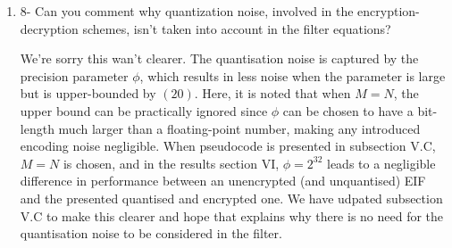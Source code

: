 \documentclass[a4paper]{scrartcl}
\newenvironment{rebuttal}{\begin{enumerate}[label={\color{grey}\thesection.\arabic{enumi}},leftmargin=0pt,ref=\thesection.\arabic{enumi}]}{\end{enumerate}}
\newcommand{\reviewtext}[1]{{\color{nblue} #1}}
\begin{document}
\begin{rebuttal}
\textit{+changes made} time was used primarily as a comparitive measure in key sizes.

\item \reviewtext{8- Can you comment why quantization noise, involved in the encryption-decryption schemes, isn't taken into account in the filter equations?}

We're sorry this wan't clearer. The quantisation noise is captured by the precision parameter $\phi$, which results in less noise when the parameter is large but is upper-bounded by $(20)$. Here, it is noted that when $M=N$, the upper bound can be practically ignored since $\phi$ can be chosen to have a bit-length much larger than a floating-point number, making any introduced encoding noise negligible. When pseudocode is presented in subsection V.C, $M=N$ is chosen, and in the results section VI, $\phi=2^{32}$ leads to a negligible difference in performance between an unencrypted (and unquantised) EIF and the presented quantised and encrypted one. We have udpated subsection V.C to make this clearer and hope that explains why there is no need for the quantisation noise to be considered in the filter.

\end{rebuttal}

\end{document}
